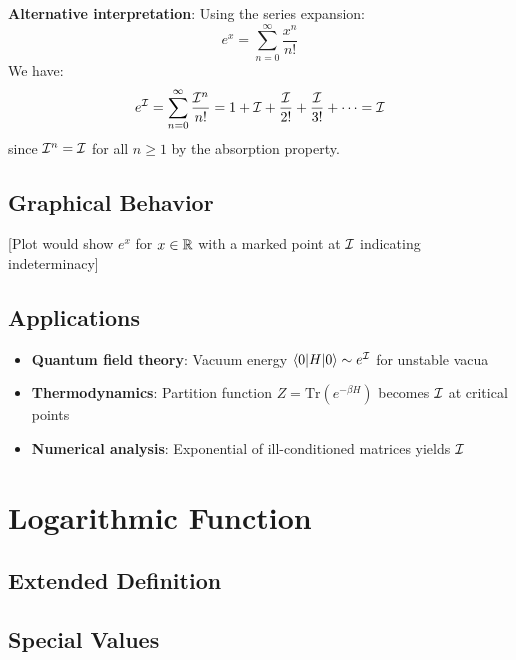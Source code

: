 \textbf{Alternative interpretation}: Using the series expansion:
\[
e^x = \sum_{n=0}^\infty \frac{x^n}{n!}
\]
We have:
\[
e^{\mathcal{I}} = \sum_{n=0}^\infty \frac{\mathcal{I}^n}{n!} = 1 + \mathcal{I} + \frac{\mathcal{I}}{2!} + \frac{\mathcal{I}}{3!} + \cdots = \mathcal{I}
\]
since $\mathcal{I}^n = \mathcal{I}$ for all $n \geq 1$ by the absorption property.

\subsection*{Graphical Behavior}

[Plot would show $e^x$ for $x \in \mathbb{R}$ with a marked point at $\mathcal{I}$ indicating indeterminacy]

\subsection*{Applications}

\begin{itemize}
    \item \textbf{Quantum field theory}: Vacuum energy $\langle 0 | H | 0 \rangle \sim e^{\mathcal{I}}$ for unstable vacua
    \item \textbf{Thermodynamics}: Partition function $Z = \text{Tr}(e^{-\beta H})$ becomes $\mathcal{I}$ at critical points
    \item \textbf{Numerical analysis}: Exponential of ill-conditioned matrices yields $\mathcal{I}$
\end{itemize}

\section*{Logarithmic Function}

\subsection*{Extended Definition}


\subsection*{Special Values}

